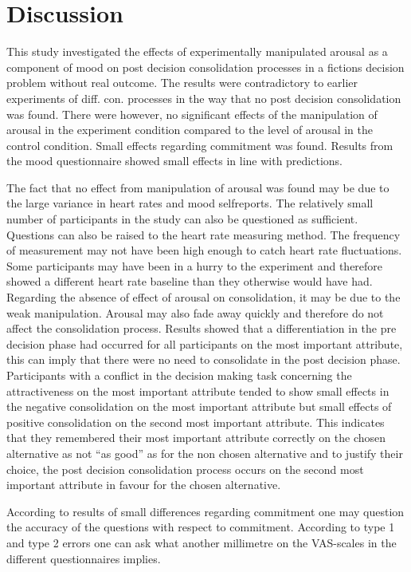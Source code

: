 \documentclass[jou,11pt]{apa6}
\begin{document}
\section{Discussion}

This study investigated the effects of experimentally manipulated
arousal as a component of mood on post decision consolidation
processes in a fictions decision problem without real outcome. The
results were contradictory to earlier experiments of
diff. con. processes in the way that  no post decision consolidation
was found.  There were however, no significant effects of the
manipulation of arousal in the experiment condition compared to the
level of arousal in the control condition.  Small effects regarding
commitment was found.   Results from the mood questionnaire showed
small effects in line with predictions.

The fact that no effect from manipulation of arousal was found may be
due to the large variance in heart rates and mood selfreports.  The
relatively small number of participants in the study can also be
questioned as sufficient.  Questions can also be raised to the heart
rate measuring  method.   The frequency of measurement may not have
been high enough to catch heart rate fluctuations.  Some participants
may have been in a hurry to the experiment and therefore showed a
different heart rate baseline than they otherwise would have had.
Regarding the absence of effect of arousal on consolidation, it may be
due to the weak manipulation.  Arousal may also fade away quickly and
therefore do not affect the consolidation process.  Results showed
that a differentiation in the pre decision phase had occurred for all
participants on the most important attribute, this can imply that
there were no need to consolidate in the post decision phase.
Participants with a conflict in the decision making task concerning
the attractiveness on the most important attribute tended to show
small effects in the negative consolidation on the most important
attribute but small effects of positive consolidation on the second
most important attribute. This indicates that they remembered their
most important attribute correctly on the chosen alternative as not
``as good'' as for the non chosen alternative and to justify their
choice, the post decision consolidation process occurs on the second
most important attribute in favour for the chosen alternative.

According to results of small differences regarding commitment  one
may question the accuracy of the questions with respect to
commitment.  According to type 1 and type 2 errors one can ask what
another millimetre on the VAS-scales in the different questionnaires
implies.
\end{document}
